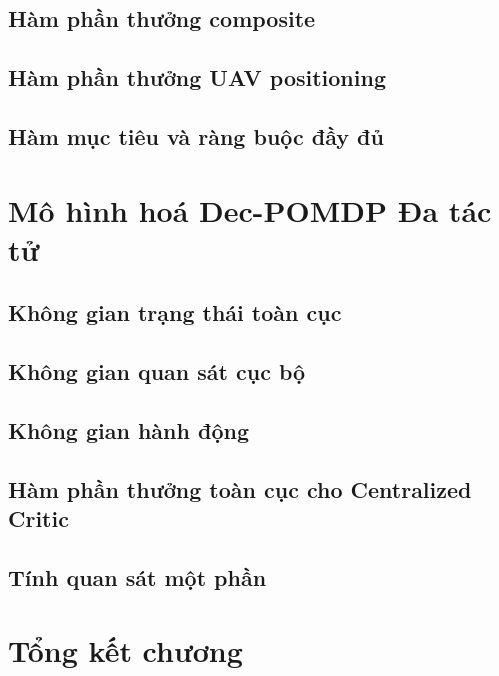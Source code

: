 \subsection{Hàm phần thưởng composite}
\label{subsec:sys:opt:reward}

\subsection{Hàm phần thưởng UAV positioning}
\label{subsec:sys:opt:uav-reward}

\subsection{Hàm mục tiêu và ràng buộc đầy đủ}
\label{subsec:sys:opt:objective}

\section{Mô hình hoá Dec-POMDP Đa tác tử}
\label{sec:sys:pomdp}

\subsection{Không gian trạng thái toàn cục}
\label{subsec:sys:pomdp:state}

\subsection{Không gian quan sát cục bộ}
\label{subsec:sys:pomdp:obs}

\subsection{Không gian hành động}
\label{subsec:sys:pomdp:action}

\subsection{Hàm phần thưởng toàn cục cho Centralized Critic}
\label{subsec:sys:pomdp:global-reward}

\subsection{Tính quan sát một phần}
\label{subsec:sys:pomdp:partial}

\section{Tổng kết chương}
\label{sec:sys:summary}
